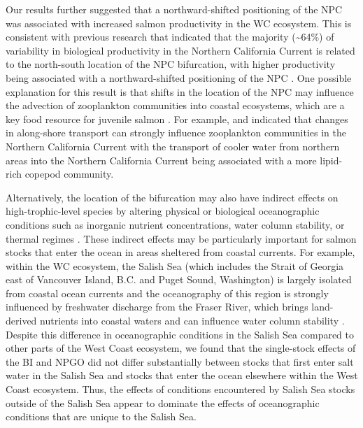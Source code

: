 Our results further suggested that a northward-shifted positioning of the NPC
was associated with increased salmon productivity in the WC ecosystem. This is
consistent with previous research that indicated that the majority
(\textasciitilde{}64\%) of variability in biological productivity in the
Northern California Current is related to the north-south location of the NPC
bifurcation, with higher productivity being associated with a northward-shifted
positioning of the NPC \citep{Sydeman2011a}. One possible explanation for this
result is that shifts in the location of the NPC may influence the advection of
zooplankton communities into coastal ecosystems, which are a key food resource
for juvenile salmon \citep{Armstrong2008a, Beauchamp2007a, Brodeur2007a}. For
example, \citet{Keister2011a} and \citet{Bi2011b} indicated that changes in
along-shore transport can strongly influence zooplankton communities in the
Northern California Current with the transport of cooler water from northern
areas into the Northern California Current being associated with a more
lipid-rich copepod community.

Alternatively, the location of the bifurcation may also have indirect effects on
high-trophic-level species by altering physical or biological oceanographic
conditions such as inorganic nutrient concentrations, water column stability, or
thermal regimes \citep{Di-Lorenzo2009a, Sydeman2011a, Keister2011a}. These
indirect effects may be particularly important for salmon stocks that enter the
ocean in areas sheltered from coastal currents. For example, within the WC
ecosystem, the Salish Sea (which includes the Strait of Georgia east of
Vancouver Island, B.C. and Puget Sound, Washington) is largely isolated from
coastal ocean currents and the oceanography of this region is strongly
influenced by freshwater discharge from the Fraser River, which brings
land-derived nutrients into coastal waters and can influence water column
stability \citep{Hickey2008a}. Despite this difference in oceanographic
conditions in the Salish Sea compared to other parts of the West Coast
ecosystem, we found that the single-stock effects of the BI and NPGO did not
differ substantially between stocks that first enter salt water in the Salish
Sea and stocks that enter the ocean elsewhere within the West Coast ecosystem.
Thus, the effects of conditions encountered by Salish Sea stocks outside of the
Salish Sea appear to dominate the effects of oceanographic conditions that are
unique to the Salish Sea.

